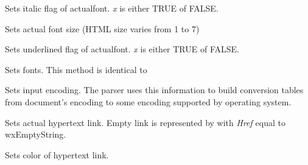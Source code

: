 
Sets italic flag of actualfont. {\it x} is either TRUE of FALSE.


\label{wxhtmlwinparsersetfontsize}


Sets actual font size (HTML size varies from 1 to 7)

\label{wxhtmlwinparsersetfontunderlined}


Sets underlined flag of actualfont. {\it x} is either TRUE of FALSE.

\label{wxhtmlwinparsersetfonts}


Sets fonts. This method is identical to 


\label{wxhtmlwinparsersetinputencoding}


Sets input encoding. The parser uses this information to build conversion
tables from document's encoding to some encoding supported by operating
system.


\label{wxhtmlwinparsersetlink}


Sets actual hypertext link. Empty link is represented
by  with {\it Href} equal
to wxEmptyString.

\label{wxhtmlwinparsersetlinkcolor}


Sets color of hypertext link.


